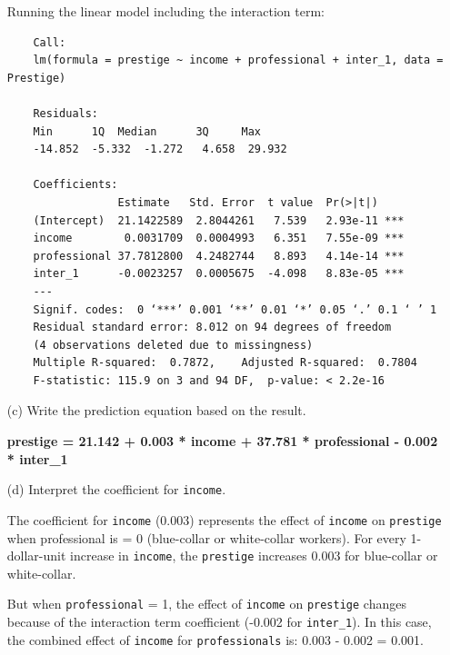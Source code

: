 \documentclass[12pt,letterpaper]{article}
\begin{document}
\begin{enumerate}
		Running the linear model including the interaction term:
	\vspace{.1cm}
	  
	
		\begin{verbatim}
	Call:
	lm(formula = prestige ~ income + professional + inter_1, data = Prestige)
	
	Residuals:
	Min      1Q  Median      3Q     Max 
	-14.852  -5.332  -1.272   4.658  29.932 
	
	Coefficients:
	             Estimate   Std. Error  t value  Pr(>|t|)    
	(Intercept)  21.1422589  2.8044261   7.539   2.93e-11 ***
	income        0.0031709  0.0004993   6.351   7.55e-09 ***
	professional 37.7812800  4.2482744   8.893   4.14e-14 ***
	inter_1      -0.0023257  0.0005675  -4.098   8.83e-05 ***
	---
	Signif. codes:  0 ‘***’ 0.001 ‘**’ 0.01 ‘*’ 0.05 ‘.’ 0.1 ‘ ’ 1
	Residual standard error: 8.012 on 94 degrees of freedom
	(4 observations deleted due to missingness)
	Multiple R-squared:  0.7872,	Adjusted R-squared:  0.7804 
	F-statistic: 115.9 on 3 and 94 DF,  p-value: < 2.2e-16
	\end{verbatim}
	
	
	
	\newpage
	
	

	\item [(c)]
	Write the prediction equation based on the result.
		\vspace{.3cm}
	
	\textbf{prestige = 21.142 + 0.003 * income + 37.781 * professional - 0.002 * inter\_1}
	\vspace{.5cm}
	

	\item [(d)]
	Interpret the coefficient for \texttt{income}.
		\vspace{.5cm}
	
		The coefficient for \texttt{income} (0.003) represents the effect of \texttt{income} on \texttt{prestige} when professional is = 0 (blue-collar or white-collar workers).
		For every 1-dollar-unit increase in \texttt{income}, the \texttt{prestige} increases 0.003 for blue-collar or white-collar.
		
		But when \texttt{professional} = 1, the effect of \texttt{income} on \texttt{prestige} changes because of the interaction term coefficient (-0.002 for \texttt{inter\_1}).	In this case, the combined effect of \texttt{income} for \texttt{professionals} is: 0.003 - 0.002 = 0.001.
		

\end{enumerate}
\end{document}
